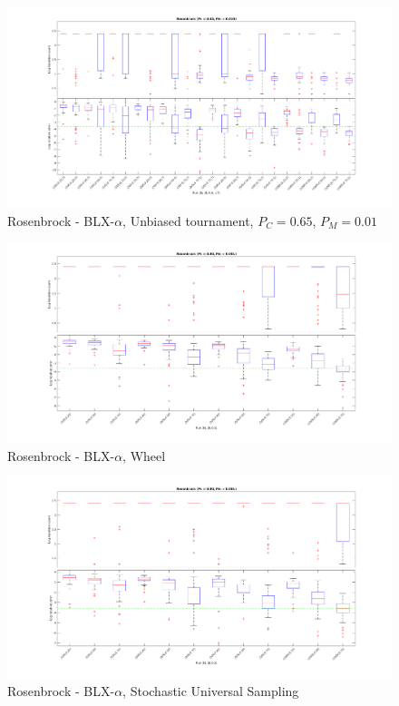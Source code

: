 \documentclass[12pt, letterpaper]{article}
\begin{document}
\begin{figure}
  \includegraphics[width=\linewidth]{img/r_blx_ut_065_010.png}
  \centering
  \captionsetup{justification=centering}
  \caption{Rosenbrock - BLX-$\alpha$, Unbiased tournament, $P_C = 0.65$, $P_M = 0.01$}
  \label{fig:r_blx_ut_065_010}
\end{figure}

\begin{figure}
  \includegraphics[width=\linewidth]{img/r_blx_w.png}
  \centering
  \captionsetup{justification=centering}
  \caption{Rosenbrock - BLX-$\alpha$, Wheel}
  \label{fig:r_blx_w}
\end{figure}

\begin{figure}
  \includegraphics[width=\linewidth]{img/r_blx_sus.png}
  \centering
  \captionsetup{justification=centering}
  \caption{Rosenbrock - BLX-$\alpha$, Stochastic Universal Sampling}
  \label{fig:r_blx_sus}
\end{figure}
\end{document}
